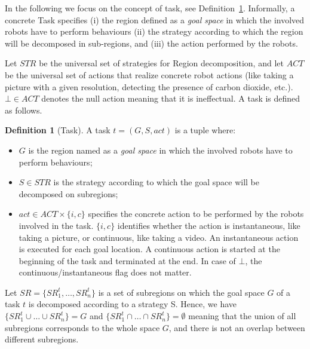 \documentclass[journal]{IEEEtran}
\theoremstyle{definition}
\newtheorem{definition}{Definition}
\newcommand\patrizio[1]{\nb{Patrizio}{#1}}
\newcommand\ivano[1]{\nb{Ivano}{#1}}
\begin{document}
In the following we focus on the concept of task, see Definition~\ref{Def:Task}. Informally, a concrete Task specifies (i) 
the region defined as a \textit{goal space} in which the involved robots have to perform behaviours 
(ii) the strategy according to which the region will be decomposed  in sub-regions, and (iii) the action performed by the robots.

Let $STR$ be the universal set of strategies for Region decomposition, and let $ACT$
be the universal set of actions that realize concrete robot actions
(like taking a picture with a given resolution, detecting the
presence of carbon dioxide, etc.). $\bot \in ACT$ denotes the null action meaning that it is ineffectual. A task is defined as follows.

\begin{definition}[Task]\label{Def:Task}
A task $t=(G,S,act)$ is a tuple where:
\begin{itemize}
\item $G$ is the region named as a \textit{goal space} in which the involved robots have to perform behaviours; 
\item $S \in STR$ is the strategy according to which the goal space will be  decomposed on subregions;
\item  $act \in ACT \times \{i, c\}$ specifies the concrete action to be performed by the robots involved in the task. $\{i, c\}$ identifies whether the action
is instantaneous, like taking a picture, or continuous, like taking a
video. An instantaneous action is executed for each goal location. A continuous action is started at the beginning of the task and terminated at the end. In case of $\bot$, the continuous/instantaneous flag
does not matter.
\end{itemize}
\end{definition}

Let $SR = \{SR^t_1, \dots, SR^t_n \}$ is a set of subregions on which the goal space $G$ of a task $t$ is decomposed according to a strategy S. 
Hence, we have $\{SR^t_1 \cup \dots \cup SR^t_n\} = G$ and 
$ \{SR^t_1 \cap \dots \cap SR^t_n\} = \emptyset$ meaning that the union of all subregions corresponds to the whole space $G$, and there is not an overlap between different subregions.
\end{document}
